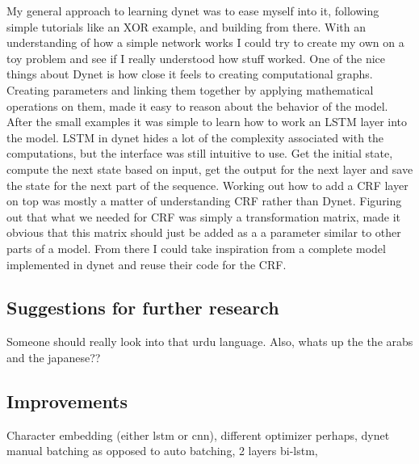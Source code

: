 My general approach to learning dynet was to ease myself into it, following
simple tutorials like an XOR example, and building from there. With an
understanding of how a simple network works I could try to create my own on a
toy problem and see if I really understood how stuff worked. One of the nice
things about Dynet is how close it feels to creating computational graphs.
Creating parameters and linking them together by applying mathematical
operations on them, made it easy to reason about the behavior of the model.
After the small examples it was simple to learn how to work an LSTM layer into
the model. LSTM in dynet hides a lot of the complexity associated with the
computations, but the interface was still intuitive to use. Get the initial
state, compute the next state based on input, get the output for the next layer
and save the state for the next part of the sequence. Working out how to add a
CRF layer on top was mostly a matter of understanding CRF rather than Dynet.
Figuring out that what we needed for CRF was simply a transformation matrix,
made it obvious that this matrix should just be added as a a parameter similar
to other parts of a model. From there I could take inspiration from a complete
model implemented in dynet and reuse their code for the CRF.


\subsection{Suggestions for further research}

Someone should really look into that urdu language. Also, whats up the the arabs
and the japanese??

\subsection{Improvements}

Character embedding (either lstm or cnn), different optimizer perhaps, dynet manual batching as
opposed to auto batching, 2 layers bi-lstm, 

\pagebreak
